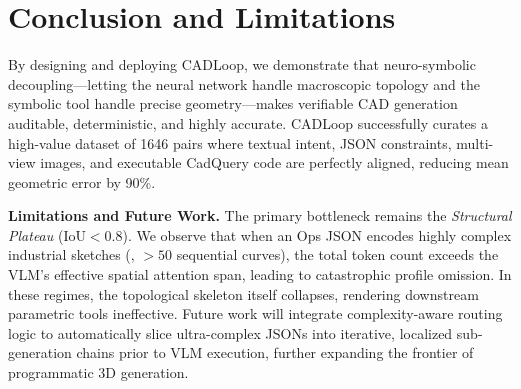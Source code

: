 \section{Conclusion and Limitations}
\label{sec:conclusion}

By designing and deploying CADLoop, we demonstrate that neuro-symbolic decoupling---letting
the neural network handle macroscopic topology and the symbolic tool handle precise
geometry---makes verifiable CAD generation auditable, deterministic, and highly accurate.
CADLoop successfully curates a high-value dataset of 1646 pairs where textual intent, JSON
constraints, multi-view images, and executable CadQuery code are perfectly aligned,
reducing mean geometric error by 90\%.

\noindent\textbf{Limitations and Future Work.}
The primary bottleneck remains the \emph{Structural Plateau} ($\text{IoU} < 0.8$).
We observe that when an Ops JSON encodes highly complex industrial sketches (\eg,
${>}50$ sequential curves), the total token count exceeds the VLM's effective spatial
attention span, leading to catastrophic profile omission.
In these regimes, the topological skeleton itself collapses, rendering downstream
parametric tools ineffective.
Future work will integrate complexity-aware routing logic to automatically slice
ultra-complex JSONs into iterative, localized sub-generation chains prior to VLM
execution, further expanding the frontier of programmatic 3D generation.
